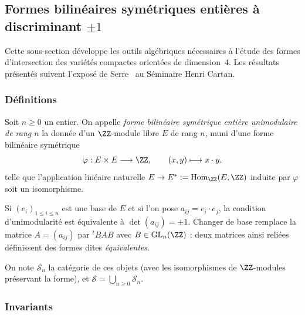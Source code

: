
\subsection{Formes bilinéaires symétriques entières à discriminant $\pm 1$}

Cette sous-section développe les outils algébriques nécessaires à l'étude des formes
d'intersection des variétés compactes orientées de dimension~$4$. Les résultats
présentés suivent l'exposé de Serre~\cite{Serre1962} au Séminaire Henri Cartan.

\subsubsection{Définitions}

\begin{definition}
Soit $n \geq 0$ un entier. On appelle \emph{forme bilinéaire symétrique entière
unimodulaire de rang $n$} la donnée d'un $\ZZ$-module libre $E$ de rang $n$,
muni d'une forme bilinéaire symétrique
\[
  \varphi : E \times E \longrightarrow \ZZ, \qquad (x,y) \longmapsto x \cdot y,
\]
telle que l'application linéaire naturelle $E \to E^* := \mathrm{Hom}_\ZZ(E,\ZZ)$
induite par $\varphi$ soit un isomorphisme.
\end{definition}

\begin{remark}
Si $(e_i)_{1 \leq i \leq n}$ est une base de $E$ et si l'on pose
$a_{ij} = e_i \cdot e_j$, la condition d'unimodularité est équivalente à
$\det(a_{ij}) = \pm 1$.
Changer de base remplace la matrice $A = (a_{ij})$ par ${}^t\!BAB$ avec
$B \in \mathrm{GL}_n(\ZZ)$ ; deux matrices ainsi reliées définissent des formes
dites \emph{équivalentes}.
\end{remark}

On note $\mathcal{S}_n$ la catégorie de ces objets (avec les isomorphismes de
$\ZZ$-modules préservant la forme), et $\mathcal{S} = \bigcup_{n \geq 0} \mathcal{S}_n$.

\medskip


\subsubsection{Invariants}

